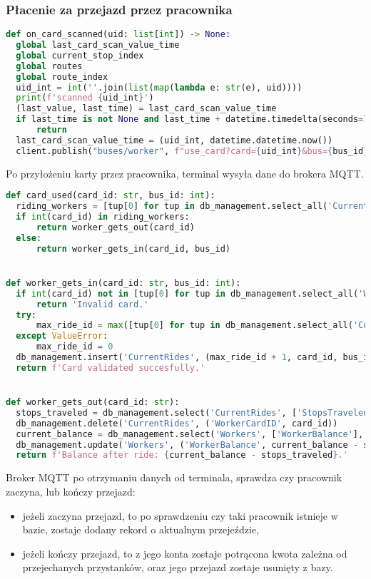 \subsubsection{Płacenie za przejazd przez pracownika}
\begin{lstlisting}[language={Python}, caption={Terminal, Lokalizacja: \texttt{client/client.py}}]
def on_card_scanned(uid: list[int]) -> None:
  global last_card_scan_value_time
  global current_stop_index
  global routes
  global route_index
  uid_int = int(''.join(list(map(lambda e: str(e), uid))))
  print(f'scanned {uid_int}')
  (last_value, last_time) = last_card_scan_value_time
  if last_time is not None and last_time + datetime.timedelta(seconds=7) > datetime.datetime.now():
      return
  last_card_scan_value_time = (uid_int, datetime.datetime.now())
  client.publish("buses/worker", f"use_card?card={uid_int}&bus={bus_id}")
\end{lstlisting}
Po przyłożeniu karty przez pracownika, terminal wysyła dane do brokera MQTT.
\pagebreak
\begin{lstlisting}[language={Python}, caption={Broker MQTT, Lokalizacja: \texttt{backend/mqtt\_server.py}}]
def card_used(card_id: str, bus_id: int):
  riding_workers = [tup[0] for tup in db_management.select_all('CurrentRides', ['WorkerCardID'])]
  if int(card_id) in riding_workers:
      return worker_gets_out(card_id)
  else:
      return worker_gets_in(card_id, bus_id)


def worker_gets_in(card_id: str, bus_id: int):
  if int(card_id) not in [tup[0] for tup in db_management.select_all('Workers', ['WorkerCardID'])]:
      return 'Invalid card.'
  try:
      max_ride_id = max([tup[0] for tup in db_management.select_all('CurrentRides', ['RideID'])])
  except ValueError:
      max_ride_id = 0
  db_management.insert('CurrentRides', (max_ride_id + 1, card_id, bus_id, 0))
  return f'Card validated succesfully.'


def worker_gets_out(card_id: str):
  stops_traveled = db_management.select('CurrentRides', ['StopsTraveled'], [('WorkerCardID', card_id)])[0][0]
  db_management.delete('CurrentRides', ('WorkerCardID', card_id))
  current_balance = db_management.select('Workers', ['WorkerBalance'], [('WorkerCardID', card_id)])[0][0]
  db_management.update('Workers', ('WorkerBalance', current_balance - stops_traveled), ('WorkerCardID', card_id))
  return f'Balance after ride: {current_balance - stops_traveled}.'
\end{lstlisting}
Broker MQTT po otrzymaniu danych od terminala, sprawdza czy pracownik zaczyna, lub kończy przejazd:
\begin{itemize}
  \item{jeżeli zaczyna przejazd, to po sprawdzeniu czy taki pracownik istnieje w bazie, zostaje dodany rekord o aktualnym przejeździe,}
  \item{jeżeli kończy przejazd, to z jego konta zostaje potrącona kwota zależna od przejechanych przystanków, oraz jego przejazd zostaje usunięty z bazy.}
\end{itemize}
